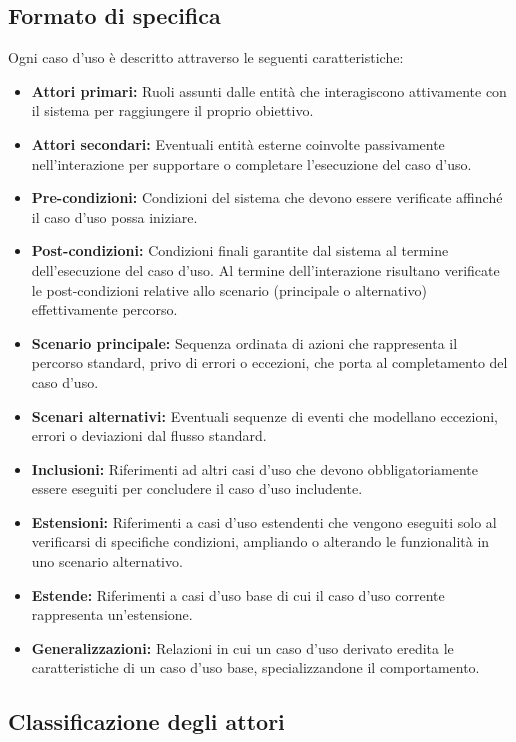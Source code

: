 \documentclass[11pt, a4paper]{article}
\begin{document}
\subsection{Formato di specifica}
Ogni caso d'uso è descritto attraverso le seguenti caratteristiche:

\begin{itemize}
    \item \textbf{Attori primari:} Ruoli assunti dalle entità che interagiscono attivamente con il sistema per raggiungere il proprio obiettivo.
    \item \textbf{Attori secondari:} Eventuali entità esterne coinvolte passivamente nell'interazione per supportare o completare l'esecuzione del caso d'uso.
    \item \textbf{Pre-condizioni:} Condizioni del sistema che devono essere verificate affinché il caso d'uso possa iniziare.
    \item \textbf{Post-condizioni:} Condizioni finali garantite dal sistema al termine dell'esecuzione del caso d'uso. Al termine dell'interazione risultano verificate le post-condizioni relative allo scenario (principale o alternativo) effettivamente percorso.
    \item \textbf{Scenario principale:} Sequenza ordinata di azioni che rappresenta il percorso standard, privo di errori o eccezioni, che porta al completamento del caso d'uso.
    \item \textbf{Scenari alternativi:} Eventuali sequenze di eventi che modellano eccezioni, errori o deviazioni dal flusso standard.
    \item \textbf{Inclusioni:} Riferimenti ad altri casi d'uso che devono obbligatoriamente essere eseguiti per concludere il caso d'uso includente.
    \item \textbf{Estensioni:} Riferimenti a casi d'uso estendenti che vengono eseguiti solo al verificarsi di specifiche condizioni, ampliando o alterando le funzionalità in uno scenario alternativo.
    \item \textbf{Estende:} Riferimenti a casi d'uso base di cui il caso d'uso corrente rappresenta un'estensione.
    \item \textbf{Generalizzazioni:} Relazioni in cui un caso d'uso derivato eredita le caratteristiche di un caso d'uso base, specializzandone il comportamento.
\end{itemize}

 
\subsection{Classificazione degli attori}
\end{document}
